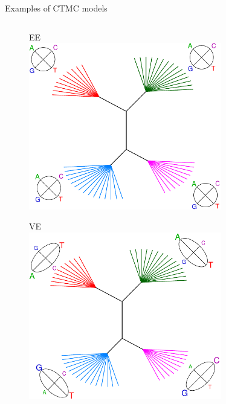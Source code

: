 \documentclass{beamer}
\begin{document}
\begin{frame}{Examples of CTMC models}

\vspace{-0.5cm}
\begin{columns}

\begin{column}{0.5\textwidth}
  \begin{figure}
  \begin{center}
  EE\\
    \includegraphics[width=0.75\textwidth]{./graph/tree_EE}

  \vspace{0.2cm}
  VE\\
    \includegraphics[width=0.75\textwidth]{./graph/tree_VE}
  \end{center}
  \end{figure}
\end{column}


\end{columns}
\end{frame}
\end{document}
